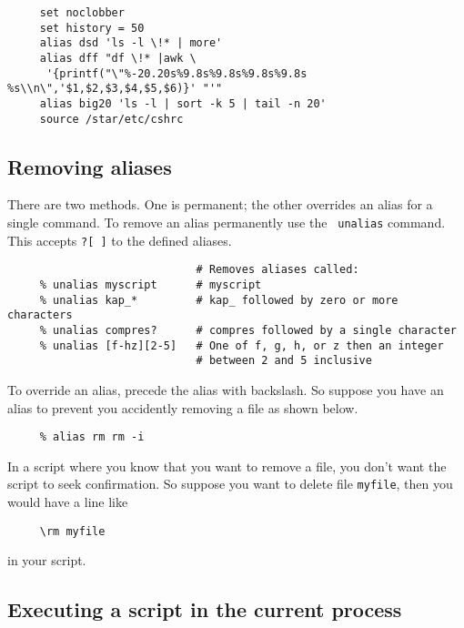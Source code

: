 \small
\begin{verbatim}
     set noclobber
     set history = 50
     alias dsd 'ls -l \!* | more'
     alias dff "df \!* |awk \
      '{printf("\"%-20.20s%9.8s%9.8s%9.8s%9.8s %s\\n\",'$1,$2,$3,$4,$5,$6)}' "'"
     alias big20 'ls -l | sort -k 5 | tail -n 20'
     source /star/etc/cshrc    
\end{verbatim}
\normalsize

\subsection{Removing aliases
\label{sc4_se_unalias}}

There are two methods.  One is permanent; the other overrides an alias
for a single command.  To remove an alias permanently use the {\tt
unalias} command.  This accepts {\tt *?[~]} 
 to  the
defined aliases.

\small
\begin{verbatim}
                             # Removes aliases called:
     % unalias myscript      # myscript
     % unalias kap_*         # kap_ followed by zero or more characters
     % unalias compres?      # compres followed by a single character
     % unalias [f-hz][2-5]   # One of f, g, h, or z then an integer
                             # between 2 and 5 inclusive
\end{verbatim}
\normalsize

To override an alias, precede the alias with backslash.  So suppose you
have an alias to prevent you accidently removing a file as shown below.

\small
\begin{verbatim}
     % alias rm rm -i
\end{verbatim}
\normalsize
In a script where you know that you want to remove a file, you don't
want the script to seek confirmation.  So suppose you want to delete
file {\tt myfile}, then you would have a line like

\small
\begin{verbatim}
     \rm myfile
\end{verbatim}
\normalsize
in your script.


\subsection{Executing a script in the current process
\label{sc4_se_source}}

